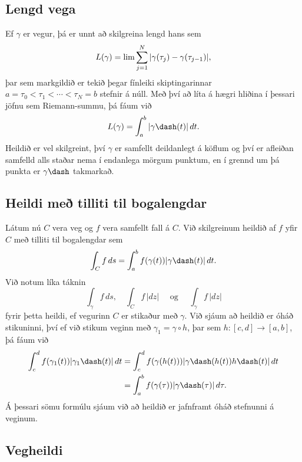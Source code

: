 \subsection*{Lengd vega}


Ef  $\gamma$ er vegur, þá er unnt að skilgreina lengd
hans sem 
$$
L(\gamma)=\lim \sum_{j=1}\sp N |\gamma(\tau_j)-\gamma(\tau_{j-1})|,
$$
þar sem markgildið er tekið þegar fínleiki skiptingarinnar
$a=\tau_0<\tau_1<\cdots<\tau_N=b$ stefnir á núll.  Með því að líta á
hægri hliðina í þessari jöfnu sem
Riemann-summu, þá fáum við
 $$L(\gamma)=\int_a\sp b |\gamma\dash(t)| \, dt.
 $$
Heildið er vel skilgreint, því $\gamma$ er samfellt deildanlegt á
köflum  og því er afleiðan samfelld alls staðar nema í endanlega
mörgum punktum, en í grennd um þá punkta er $\gamma\dash$ takmarkað.  

\subsection*{Heildi með tilliti til bogalengdar}


Látum nú $C$ vera  veg og $f$ vera samfellt fall á $C$.  Við
skilgreinum  heildið af $f$ yfir $C$ með tilliti til
bogalengdar sem 
 $$\int_Cf \, ds = \int_a\sp b f(\gamma(t)) |\gamma\dash(t)|\, dt.
 $$
Við notum líka táknin
$$\int_\gamma f\, ds,  \quad \int_C f\, |dz| \quad \text { og }
\quad \int_\gamma f\, |dz|
$$
fyrir þetta heildi, ef vegurinn $C$ er stikaður með $\gamma$.  Við
sjáum að heildið er óháð stikuninni, því ef við stikum veginn með
$\gamma_1=\gamma\circ h$, þar sem $h:[c,d]\to [a,b]$, þá  fáum við
\begin{align*}
\int_c\sp d f(\gamma_1(t)) |\gamma_1\dash(t)|\, dt&=
\int_c\sp d f(\gamma(h(t))) |\gamma\dash(h(t))h\dash(t)|\, dt\\
&=
\int_a\sp bf(\gamma(\tau))|\gamma\dash(\tau)| \, d\tau.
\end{align*}
{Á} þessari sömu formúlu sjáum við að heildið er jafnframt óháð
stefnunni á veginum.  

\subsection*{Vegheildi}

